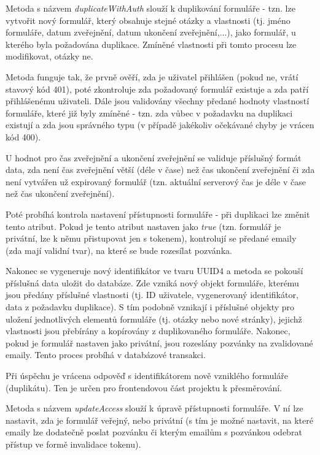 			Metoda s názvem \textit{duplicateWithAuth} slouží k duplikování formuláře - tzn. lze vytvořit nový formulář, který obsahuje stejné otázky a vlastnosti (tj. jméno formuláře, datum zveřejnění, datum ukončení zveřejnění,...), jako formulář, u kterého byla požadována duplikace. Zmíněné vlastnosti při tomto procesu lze modifikovat, otázky ne.
			
			Metoda funguje tak, že prvně ověří, zda je uživatel přihlášen (pokud ne, vrátí stavový kód 401), poté zkontroluje zda požadovaný formulář existuje a zda patří přihlášenému uživateli. Dále jsou validovány všechny předané hodnoty vlastností formuláře, které již byly zmíněné - tzn. zda vůbec v požadavku na duplikaci existují a zda jsou správného typu (v případě jakékoliv očekávané chyby je vrácen kód 400). 
			
			U hodnot pro čas zveřejnění a ukončení zveřejnění se validuje příslušný formát data, zda není čas zveřejnění větší (déle v čase) než čas ukončení zveřejnění či zda není vytvářen už expirovaný formulář (tzn. aktuální serverový čas je déle v čase než čas ukončení zveřejnění). 
			
			Poté probíhá kontrola nastavení přístupnosti formuláře - při duplikaci lze změnit tento atribut. Pokud je tento atribut nastaven jako \textit{true} (tzn. formulář je privátní, lze k němu přistupovat jen s tokenem), kontrolují se předané emaily (zda mají validní tvar), na které se bude rozesílat pozvánka.
			
			Nakonec se vygeneruje nový identifikátor ve tvaru UUID4 a metoda se pokouší příslušná data uložit do databáze. Zde vzniká nový objekt formuláře, kterému jsou předány příslušné vlastnosti (tj. ID uživatele, vygenerovaný identifikátor, data z požadavku duplikace). S tím podobně vznikají i příslušné objekty pro uložení jednotlivých elementů formuláře (tj. otázky nebo nové stránky), jejichž vlastnosti jsou přebírány a kopírovány z duplikovaného formuláře. Nakonec, pokud je formulář nastaven jako privátní, jsou rozeslány pozvánky na zvalidované emaily. Tento proces probíhá v databázové transakci.
			
			Při úspěchu je vrácena odpověď s identifikátorem nově vzniklého formuláře (duplikátu). Ten je určen pro frontendovou část projektu k přesměrování.
								
			\label{sec:form_accessibility}
			Metoda s názvem \textit{updateAccess} slouží k úpravě přístupnosti formuláře. V ní lze nastavit, zda je formulář veřejný, nebo privátní (s tím je možné nastavit, na které emaily lze dodatečně poslat pozvánku či kterým emailům s pozvánkou odebrat přístup ve formě invalidace tokenu).
			
